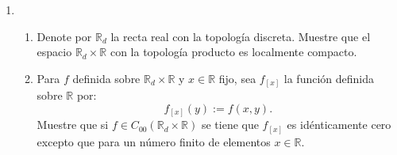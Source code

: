 \documentclass[letter,twoside,12pt]{article}
\numberwithin{equation}{section}
\begin{document}
\begin{enumerate}[label = (\textbf{\arabic*.})]
\begin{enumerate}[label = (\textbf{\roman*.})]
\begin{proof}
Puesto que $A \subseteq B$ tenemos que $X \backslash B \subseteq X \backslash A $ y por lo tanto $[X\backslash A] \cap [X\backslash B] = [X\backslash B]$, es decir que
\begin{equation}
{\mathfrak{m}}([X\backslash A] \cap [X\backslash B] ) = {\mathfrak{m}}(X\backslash B ) \label{eq:cap}
\end{equation}.

Utilizando \eqref{eq:dif} \eqref{eq:medB2} y \eqref{eq:cap} deducimos que \begin{equation}
{\mathfrak{m}}([X\backslash A] \cap B ) = \mathfrak{m}(X\backslash A) - {\mathfrak{m}}([X\backslash A] \cap [X\backslash B] ) = \mathfrak{m}(X\backslash A) -  \mathfrak{m}(X\backslash B) =  0.
\end{equation} 

Así, concluimos que el conjunto  $ [X\backslash A] \cap B$ tiene medida 0 y por lo tanto es $\mathfrak{m}$-medible. Ver \cite[Teorema 10.7]{hewitt}. Por ultimo, puesto que podemos escribir $ A $ como intersección de $ \mathfrak{m}- $medibles, valiendonos de la siguiente expresión,

\begin{equation}
A = B \cap ([X \backslash A] \cap B)^C
\end{equation}

concluimos que $ A $ es medible.
\end{proof}

\item Muestre que aunque se tenga $ \mathfrak{m}(X) < \infty $ en general pueden existir conjuntos $ A \subseteq X $ \textbf{no medibles} según Carathéodory tales que

$$ \mathfrak{m}(A) + \mathfrak{m}(X \ A) = \mathfrak{m}(X) $$

(Sugerencia: Existe un ejemplo con $ |X| = 3 $.)
\end{enumerate}

\item \begin{enumerate}[label = (\textbf{\roman*.})]
\item Denote por $ \mathbb{R}_d $ la recta real con la topología discreta. Muestre que el espacio $\mathbb{R}_d \times \mathbb{R}  $ con la topología producto es localmente compacto.

\item Para $ f $ definida sobre $ \mathbb{R}_d \times \mathbb{R} $ y $ x \in \mathbb{R} $ fijo, sea $ f_{[x]} $ la función definida sobre $ \mathbb{R} $ por:
$$ f_{[x]}(y):=f(x,y). $$
Muestre que si $ f \in C_{00}(\mathbb{R}_d \times \mathbb{R}) $ se tiene que $ f_{[x]} $ es idénticamente cero excepto que para un número finito de elementos $ x \in \mathbb{R} $.


\end{enumerate}
\end{enumerate}
\end{document}
